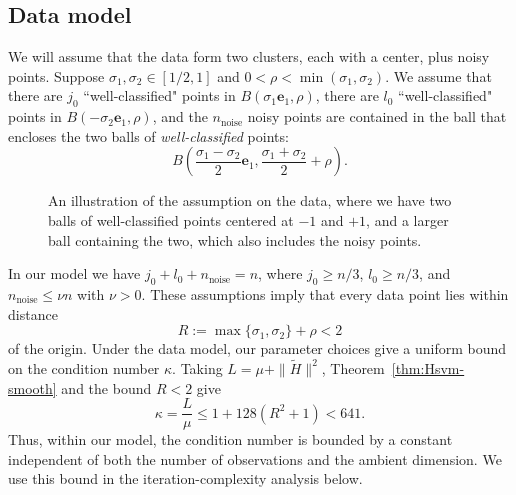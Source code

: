 \documentclass[twoside,11pt]{article}
\newcommand{\R}{{\mathbb{R}}} %
\renewcommand\r{\bm{r}}
\newcommand\e{\bm{e}}
\newcommand\tH{\tilde{H}}
\begin{document}
\subsection{Data model} \label{sec:svm-assumptions}
We will assume that the data form two clusters, each with a center, plus noisy points.
Suppose $\sigma_1,\sigma_2 \in [1/2,1]$ and $0 < \rho < \min(\sigma_1,\sigma_2)$. We assume that there are
$j_0$ ``well-classified" points in $B(\sigma_1\e_1,\rho)$, there are $l_0$ ``well-classified" points in $B(-\sigma_2\e_1,\rho)$,
and the $n_{\text{noise}}$ noisy points are contained in the ball that encloses the two balls of \textit{well-classified} points:
\[
  B\left(\frac{\sigma_1 - \sigma_2}{2}\e_1, \frac{\sigma_1 + \sigma_2}{2} + \rho\right).
\]
\begin{figure}[ht]
  \centering
  \caption{An illustration of the assumption on the data, where we have two balls of well-classified points centered at $-1$ and $+1$, and a larger ball containing the two, which also includes the noisy points.}
  \label{fig:ball-assumption}
\end{figure}
In our model we have $j_0 + l_0 + n_{\text{noise}} = n$, where
$j_0 \geq n/3$, $l_0 \geq n/3$, and $n_{\text{noise}} \leq \nu n$ with $\nu > 0$. These assumptions imply that every data point lies within distance
\[
    R:=\max\{\sigma_1,\sigma_2\}+\rho < 2
\]
of the origin. Under the data model, our parameter choices give a
uniform bound on the condition number $\kappa$. Taking
$L= \mu + \|\tH\|^2$, Theorem~\ref{thm:Hsvm-smooth}
and the bound $R < 2$ give
\[
    \kappa=\frac{L}{\mu} \leq 1+128(R^2+1) < 641.
\]
Thus, within our model, the condition number is bounded
by a constant independent of both the number of
observations and the ambient dimension. We use this
bound in the iteration-complexity analysis below.
\end{document}
